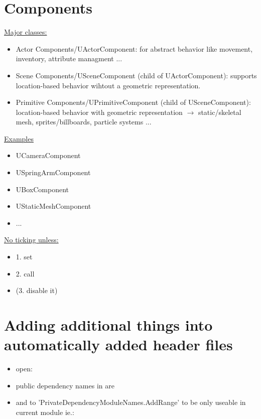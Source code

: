     \section{Components}
        \uline{Major classes:}
        \begin{itemize}
            \item Actor Components/UActorComponent: for abstract behavior like movement, inventory, attribute managment ...
            \item Scene Components/USceneComponent (child of UActorComponent): supports location-based behavior wihtout a geometric representation.
            \item Primitive Components/UPrimitiveComponent (child of USceneComponent):  location-based behavior with geometric representation $\rightarrow$ static/skeletal mesh, sprites/billboards, particle systems ...
        \end{itemize}
        \uline{Examples}
        \begin{itemize}
            \item UCameraComponent
            \item USpringArmComponent
            \item UBoxComponent
            \item UStaticMeshComponent
            \item ...
        \end{itemize}
        \uline{No ticking unless:}
        \begin{itemize}
            \item 1. set 
            \item 2. call 
            \item (3. disable it) 
        \end{itemize}

    \section{Adding additional things into automatically added header files}
        \begin{itemize}
            \item open: 
            \item public dependency names in  are 
            \item and to 'PrivateDependencyModuleNames.AddRange' to be only useable in current module ie.: 
        \end{itemize}

